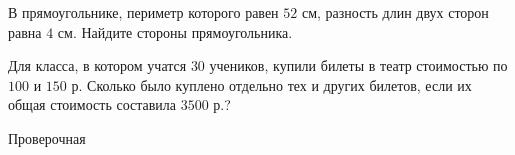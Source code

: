 \begin{class}[number=7]
\begin{listofex}
		\item В прямоугольнике, периметр которого равен \(52\) см, разность длин двух сторон равна \(4\) см. Найдите стороны прямоугольника.
		\item Для класса, в котором учатся \(30\) учеников, купили билеты в театр стоимостью по \(100\) и \(150\) р. Сколько было куплено отдельно тех и других билетов, если их общая стоимость составила \(3500\) р.?
	\end{listofex}
\end{class}

\begin{exam}
	\begin{listofex}
		\item Проверочная
	\end{listofex}
\end{exam}
